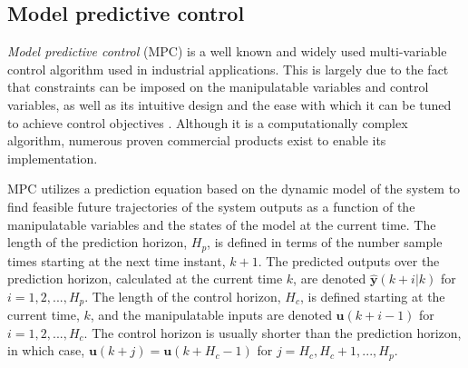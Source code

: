 \subsection{Model predictive control}

\textit{Model predictive control} (MPC) is a well known and widely used multi-variable control algorithm used in industrial applications. This is largely due to the fact that constraints can be imposed on the manipulatable variables and control variables, as well as its intuitive design and the ease with which it can be tuned to achieve control objectives \citep{maciejowski_predictive_2002}. Although it is a computationally complex algorithm, numerous proven commercial products exist to enable its implementation.

MPC utilizes a prediction equation based on the dynamic model of the system to find feasible future trajectories of the system outputs as a function of the manipulatable variables and the states of the model at the current time. The length of the prediction horizon, $H_p$, is defined in terms of the number sample times starting at the next time instant, $k+1$. The predicted outputs over the prediction horizon, calculated at the current time $k$, are denoted $\hat{\textbf{y}}(k+i | k)$ for $i=1,2,...,H_p$. The length of the control horizon, $H_c$, is defined starting at the current time, $k$, and the manipulatable inputs are denoted $\mathbf{u}(k+i-1)$ for $i=1,2,...,H_c$. The control horizon is usually shorter than the prediction horizon, in which case, $\mathbf{u}(k+j)=\mathbf{u}(k+H_c-1)$ for $j=H_c,H_c+1,...,H_p$.

